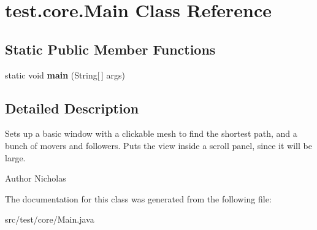 \hypertarget{classtest_1_1core_1_1_main}{\section{test.\-core.\-Main Class Reference}
\label{classtest_1_1core_1_1_main}
}
\subsection*{Static Public Member Functions}
\begin{DoxyCompactItemize}
\item 
\hypertarget{classtest_1_1core_1_1_main_a0a33dc4a053de70be8edc1484bba1475}{static void {\bfseries main} (String\mbox{[}$\,$\mbox{]} args)}\label{classtest_1_1core_1_1_main_a0a33dc4a053de70be8edc1484bba1475}

\end{DoxyCompactItemize}


\subsection{Detailed Description}
Sets up a basic window with a clickable mesh to find the shortest path, and a bunch of movers and followers. Puts the view inside a scroll panel, since it will be large.

\begin{DoxyAuthor}{Author}
Nicholas 
\end{DoxyAuthor}


The documentation for this class was generated from the following file\-:\begin{DoxyCompactItemize}
\item 
src/test/core/Main.\-java\end{DoxyCompactItemize}
